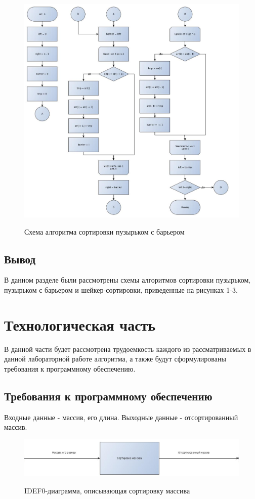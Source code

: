 \documentclass[a4paper, 14pt]{article}
\begin{document}
        \newpage        
        	\begin{figure}[h]
        	\begin{center}
        		{\includegraphics[scale=0.41]{shaker}}
        		\caption{Схема алгоритма сортировки пузырьком с барьером}
        	\end{center}
        \end{figure}
		\subsection{Вывод}
		В данном разделе были рассмотрены схемы алгоритмов сортировки пузырьком, пузырьком с барьером и шейкер-сортировки, приведенные на рисунках 1-3.
		
		\newpage
		\section{Технологическая часть}
		В данной части будет рассмотрена трудоемкость каждого из рассматриваемых в данной лабораторной работе алгоритма, а также будут сформулированы требования к программному обеспечению.
		\subsection{Требования к программному обеспечению}
		Входные данные - массив, его длина.
		Выходные данные - отсортированный массив.
        	\begin{figure}[h]
        	\begin{center}
        		{\includegraphics[scale=0.48]{idef0}}
        		\caption{IDEF0-диаграмма, описывающая сортировку массива}
        	\end{center}
        \end{figure}
\end{document}
